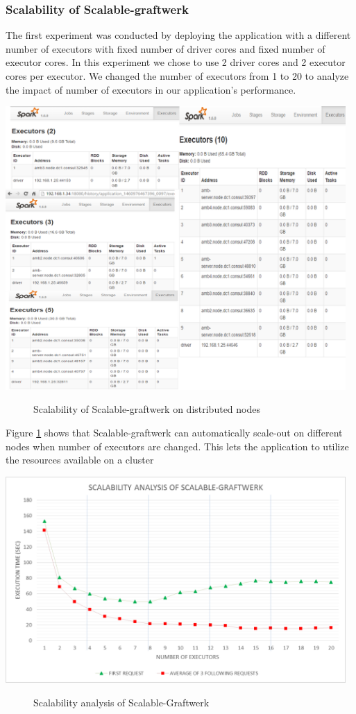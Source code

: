 \subsubsection{\textbf{Scalability of Scalable-graftwerk}}
\label{scalability-exp}
The first experiment was conducted by deploying the application with a different number of executors with fixed number of driver cores and fixed number of executor cores. In this experiment we chose to use 2 driver cores and 2 executor cores per executor. We changed the number of executors from 1 to 20 to analyze the impact of number of executors in our application's performance. 
\begin{center}
	\includegraphics[width=35em]{./Figures/scale}
	\begin{figure}[htbp]
    \caption{Scalability of Scalable-graftwerk on distributed nodes}
    \label{fig:scale}
	\end{figure}
\end{center}
Figure \ref{fig:scale} shows that Scalable-graftwerk can automatically scale-out on different nodes when number of executors are changed. This lets the application to utilize the resources available on a cluster
\begin{center}
	\includegraphics[width=35em]{./Figures/executors2}
	\begin{figure}[htbp]
    \caption{Scalability analysis of Scalable-Graftwerk}
    \label{fig:executors}
	\end{figure}
\end{center}
